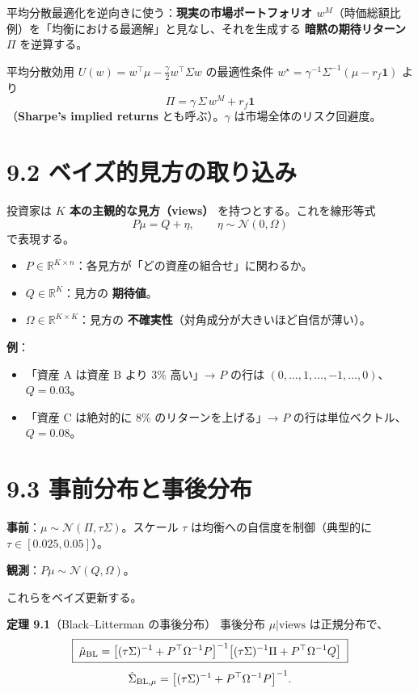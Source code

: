 \documentclass[11pt,a4paper]{report}
\begin{document}
平均分散最適化を逆向きに使う：\textbf{現実の市場ポートフォリオ $w^M$}（時価総額比例）を「均衡における最適解」と見なし、それを生成する \textbf{暗黙の期待リターン} $\Pi$ を逆算する。

平均分散効用 $U(w) = w^\top\mu - \tfrac{\gamma}{2} w^\top \Sigma w$ の最適性条件 $w^\star = \gamma^{-1} \Sigma^{-1} (\mu - r_f\mathbf{1})$ より \[ \boxed{\; \Pi = \gamma\, \Sigma\, w^M + r_f \mathbf{1} \;} \] （\textbf{Sharpe’s implied returns} とも呼ぶ）。$\gamma$ は市場全体のリスク回避度。

\section{9.2 ベイズ的見方の取り込み}

投資家は \textbf{$K$ 本の主観的な見方（views）} を持つとする。これを線形等式 \[ P \mu = Q + \eta, \qquad \eta \sim \mathcal{N}(0, \Omega) \] で表現する。
\begin{itemize}
\item $P \in \mathbb{R}^{K\times n}$：各見方が「どの資産の組合せ」に関わるか。
\item $Q \in \mathbb{R}^K$：見方の \textbf{期待値}。
\item $\Omega \in \mathbb{R}^{K\times K}$：見方の \textbf{不確実性}（対角成分が大きいほど自信が薄い）。
\end{itemize}

\textbf{例}：
\begin{itemize}
\item 「資産 A は資産 B より 3\% 高い」→ $P$ の行は $(0, \dots, 1, \dots, -1, \dots, 0)$、$Q = 0.03$。
\item 「資産 C は絶対的に 8\% のリターンを上げる」→ $P$ の行は単位ベクトル、$Q = 0.08$。
\end{itemize}

\section{9.3 事前分布と事後分布}

\textbf{事前}：$\mu \sim \mathcal{N}(\Pi, \tau \Sigma)$。スケール $\tau$ は均衡への自信度を制御（典型的に $\tau \in [0.025, 0.05]$）。

\textbf{観測}：$P \mu \sim \mathcal{N}(Q, \Omega)$。

これらをベイズ更新する。

\textbf{定理 9.1}（Black–Litterman の事後分布） 事後分布 $\mu | \text{views}$ は正規分布で、 \[ \boxed{\; \hat\mu_{\rm BL} = \bigl[(\tau\Sigma)^{-1} + P^\top \Omega^{-1} P \bigr]^{-1}\bigl[(\tau\Sigma)^{-1} \Pi + P^\top \Omega^{-1} Q\bigr] \;} \] \[ \hat\Sigma_{\rm BL,\mu} = \bigl[(\tau\Sigma)^{-1} + P^\top \Omega^{-1} P\bigr]^{-1}. \]
\end{document}
